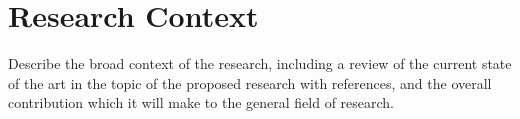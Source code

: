 \chapter{Research Context}
Describe the broad context of the research, including a review of the current state of the art in the topic of the proposed research with references, and the overall contribution which it will make to the general field of research.

